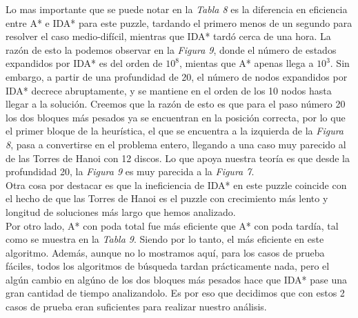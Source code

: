 \documentclass[a4paper,10pt]{article}
\begin{document}
    Lo mas importante que se puede notar en la \textit{Tabla 8} es la diferencia en
    eficiencia entre A* e IDA* para este puzzle, tardando el primero menos de un 
    segundo para resolver el caso medio-dif\'icil, mientras que IDA* tard\'o cerca
    de una hora. La raz\'on de esto la podemos observar en la \textit{Figura 9}, 
    donde el n\'umero de estados expandidos por IDA* es del orden de $10^8$, mientas
    que A* apenas llega a $10^3$. Sin embargo, a partir de una profundidad de 20,
    el n\'umero de nodos expandidos por IDA* decrece abruptamente, y se mantiene en 
    el orden de los 10 nodos hasta llegar a la soluci\'on. Creemos que la raz\'on de 
    esto es que para el paso n\'umero 20 los dos bloques m\'as pesados ya se encuentran
    en la posici\'on correcta, por lo que el primer bloque de la heur\'istica, el 
    que se encuentra a la izquierda de la \textit{Figura 8}, pasa a convertirse en 
    el problema entero, llegando a una caso muy parecido al de las Torres de Hanoi
    con 12 discos. Lo que apoya nuestra teor\'ia es que desde la profundidad 20,
    la \textit{Figura 9} es muy parecida a la \textit{Figura 7}. \\
    
    Otra cosa por destacar es que la ineficiencia de IDA* en este puzzle coincide 
    con el hecho de que las Torres de Hanoi es el puzzle con crecimiento m\'as lento 
    y longitud de soluciones m\'as largo que hemos analizado.\\
    
    Por otro lado, A* con poda total fue m\'as eficiente que A* con poda tard\'ia,
    tal como se muestra en la \textit{Tabla 9}. Siendo por lo tanto, el m\'as
    eficiente en este algoritmo. Adem\'as, aunque no lo mostramos aqu\'i, para 
    los casos de prueba f\'aciles, todos los algoritmos de b\'usqueda tardan
    pr\'acticamente nada, pero el alg\'un cambio en alg\'uno de los dos bloques
    m\'as pesados hace que IDA* pase una gran cantidad de tiempo analizandolo. Es por eso 
    que decidimos que con estos 2 casos de prueba eran suficientes para realizar 
    nuestro an\'alisis.
    
\end{document}
